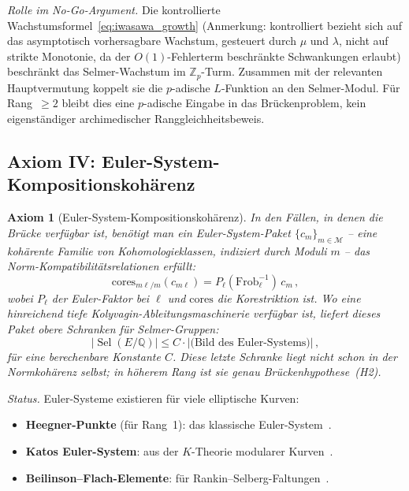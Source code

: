 \documentclass[aps,prd,twocolumn,superscriptaddress,nofootinbib,floatfix]{revtex4-2}
\newtheorem{axiom}[theorem]{Axiom}
\theoremstyle{definition}
\theoremstyle{remark}
\DeclareMathOperator{\Sel}{Sel}
\begin{document}
\textit{Rolle im No-Go-Argument.} Die kontrollierte Wachstumsformel~\eqref{eq:iwasawa_growth} (Anmerkung: \glqq kontrolliert\grqq{} bezieht sich auf das asymptotisch vorhersagbare Wachstum, gesteuert durch $\mu$ und $\lambda$, nicht auf strikte Monotonie, da der $O(1)$-Fehlerterm beschränkte Schwankungen erlaubt) beschränkt das Selmer-Wachstum im $\mathbb{Z}_p$-Turm. Zusammen mit der relevanten Hauptvermutung koppelt sie die $p$-adische $L$-Funktion an den Selmer-Modul. Für Rang~$\geq 2$ bleibt dies eine $p$-adische Eingabe in das Brückenproblem, kein eigenständiger archimedischer Ranggleichheitsbeweis.

\subsection{Axiom IV: Euler-System-Kompositionskohärenz}

\begin{axiom}[Euler-System-Kompositionskohärenz]
\label{ax:euler}
In den Fällen, in denen die Brücke verfügbar ist, benötigt man ein Euler-System-Paket $\{c_m\}_{m \in \mathcal{M}}$ -- eine kohärente Familie von Kohomologieklassen, indiziert durch Moduli $m$ -- das Norm-Kompatibilitätsrelationen erfüllt:
\begin{equation}
\mathrm{cores}_{m\ell/m}(c_{m\ell}) = P_\ell(\mathrm{Frob}_\ell^{-1})\, c_m\,,
\label{eq:euler_norm}
\end{equation}
wobei $P_\ell$ der Euler-Faktor bei $\ell$ und $\mathrm{cores}$ die Korestriktion ist. Wo eine hinreichend tiefe Kolyvagin-Ableitungsmaschinerie verfügbar ist, liefert dieses Paket obere Schranken für Selmer-Gruppen:
\begin{equation}
|\Sel(E/\mathbb{Q})| \leq C \cdot |\text{(Bild des Euler-Systems)}|\,,
\end{equation}
für eine berechenbare Konstante $C$. Diese letzte Schranke liegt nicht schon in der Normkohärenz selbst; in höherem Rang ist sie genau Brückenhypothese~(H2).
\end{axiom}

\textit{Status.} Euler-Systeme existieren für viele elliptische Kurven:
\begin{itemize}
\item \textbf{Heegner-Punkte} (für Rang~1): das klassische Euler-System~\cite{Kolyvagin1990}.
\item \textbf{Katos Euler-System}: aus der $K$-Theorie modularer Kurven~\cite{Kato2004}.
\item \textbf{Beilinson--Flach-Elemente}: für Rankin--Selberg-Faltungen~\cite{LLZ2014}.
\end{itemize}
\end{document}
